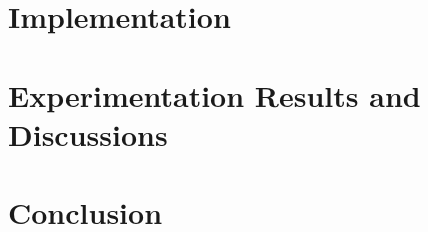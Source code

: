 \documentclass[journal,twoside,web]{ieeecolor}
\begin{document}
\section{Implementation}
\label{sec:implementation}

\section{Experimentation Results and Discussions}
\label{sec:discussion}

\section{Conclusion}
\label{sec:conclusion}



\end{document}
